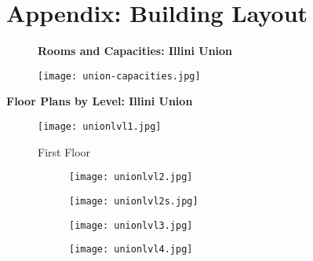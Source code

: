 \section{Appendix: Building Layout}

\begin{figure}[H]
	\centering
	\textbf{Rooms and Capacities: Illini Union} \par\medskip
	\texttt{[image: union-capacities.jpg]}
\end{figure}

\newpage
{\centering\textbf{Floor Plans by Level: Illini Union} \par\medskip}
\begin{figure}[H]
	\centering
	\texttt{[image: unionlvl1.jpg]}
	\caption{First Floor}
\end{figure}

\begin{figure}[H]
	\centering
	\begin{subfigure}{0.5\textwidth}
		\centering
		\texttt{[image: unionlvl2.jpg]}
	\end{subfigure}%
	\begin{subfigure}{0.5\textwidth}
		\centering
		\texttt{[image: unionlvl2s.jpg]}
	\end{subfigure}
	\begin{subfigure}{0.5\textwidth}
		\centering
		\texttt{[image: unionlvl3.jpg]}
	\end{subfigure}%
	\begin{subfigure}{0.5\textwidth}
		\centering
		\texttt{[image: unionlvl4.jpg]}
	\end{subfigure}		
\end{figure}